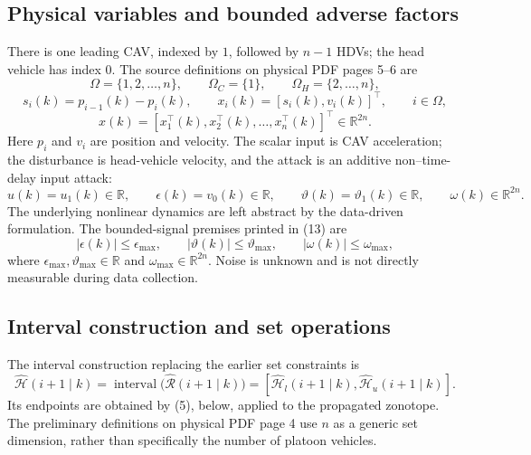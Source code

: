 \documentclass{article}
\begin{document}
\subsection*{Physical variables and bounded adverse factors}
There is one leading CAV, indexed by $1$, followed by $n-1$ HDVs; the head vehicle has index $0$. The source definitions on physical PDF pages 5--6 are
\[
\Omega=\{1,2,\ldots,n\},\qquad \Omega_C=\{1\},\qquad \Omega_H=\{2,\ldots,n\},
\]
\[
s_i(k)=p_{i-1}(k)-p_i(k),\qquad x_i(k)=[s_i(k),v_i(k)]^\top,\qquad i\in\Omega,
\]
\begin{equation}
x(k)=\left[x_1^\top(k),x_2^\top(k),\ldots,x_n^\top(k)\right]^\top\in\mathbb{R}^{2n}. \tag{11}
\end{equation}
Here $p_i$ and $v_i$ are position and velocity. The scalar input is CAV acceleration; the disturbance is head-vehicle velocity, and the attack is an additive non--time-delay input attack:
\[
u(k)=u_1(k)\in\mathbb{R},\qquad \epsilon(k)=v_0(k)\in\mathbb{R},\qquad \vartheta(k)=\vartheta_1(k)\in\mathbb{R},\qquad \omega(k)\in\mathbb{R}^{2n}.
\]
The underlying nonlinear dynamics are left abstract by the data-driven formulation. The bounded-signal premises printed in (13) are
\begin{equation}
|\epsilon(k)|\leq\epsilon_{\max},\qquad |\vartheta(k)|\leq\vartheta_{\max},\qquad |\omega(k)|\leq\omega_{\max}, \tag{13}
\end{equation}
where $\epsilon_{\max},\vartheta_{\max}\in\mathbb{R}$ and $\omega_{\max}\in\mathbb{R}^{2n}$. Noise is unknown and is not directly measurable during data collection.

\subsection*{Interval construction and set operations}
The interval construction replacing the earlier set constraints is
\begin{equation}
\hat{\mathcal{H}}(i+1\mid k)=\operatorname{interval}\bigl(\hat{\mathcal{R}}(i+1\mid k)\bigr)
=[\hat{\mathcal{H}}_l(i+1\mid k),\hat{\mathcal{H}}_u(i+1\mid k)]. \tag{49}
\end{equation}
Its endpoints are obtained by (5), below, applied to the propagated zonotope. The preliminary definitions on physical PDF page 4 use $n$ as a generic set dimension, rather than specifically the number of platoon vehicles.
\end{document}
